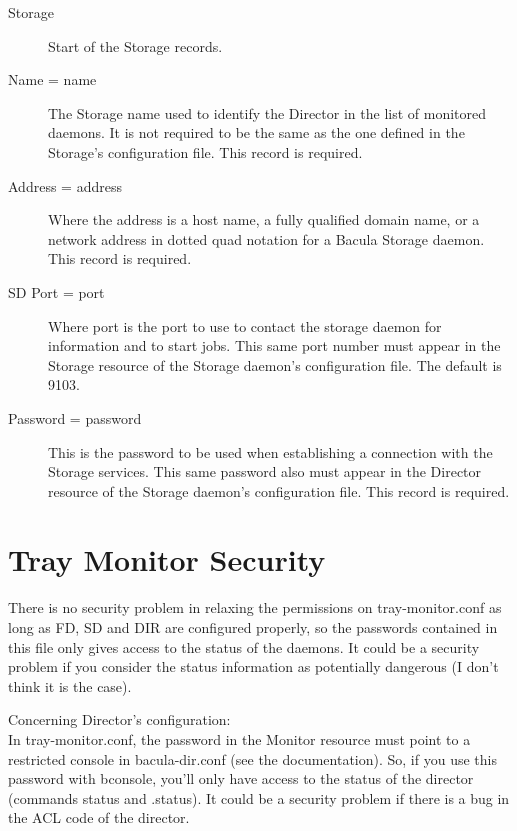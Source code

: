 \begin{description}

\item [Storage]
   Start of the Storage records. 

\item [Name = \lt{}name\gt{}]
   The Storage name used to identify  the Director in the list of monitored
daemons. It is not required  to be the same as the one defined in the Storage's
configuration file.  This record is required. 

\item [Address = \lt{}address\gt{}]
   Where the address is a host  name, a fully qualified domain name, or a network
address in  dotted quad notation for a Bacula Storage daemon.  This record is
required. 

\item [SD Port = \lt{}port\gt{}]
   Where port is the port to use to  contact the storage daemon for information
and to start jobs.  This same port number must appear in the Storage resource
of the  Storage daemon's configuration file. The default is 9103. 

\item [Password = \lt{}password\gt{}]
   This is the password to be used  when establishing a connection with the
Storage services. This  same password also must appear in the Director
resource of the Storage  daemon's configuration file. This record is required.

\end{description}

\section{Tray Monitor Security}

There is no security problem in relaxing the permissions on
tray-monitor.conf as long as FD, SD and DIR are configured properly, so
the passwords contained in this file only gives access to the status of
the daemons. It could be a security problem if you consider the status
information as potentially dangerous (I don't think it is the case).

Concerning Director's configuration: \\
In tray-monitor.conf, the password in the Monitor resource must point to
a restricted console in bacula-dir.conf (see the documentation). So, if
you use this password with bconsole, you'll only have access to the
status of the director (commands status and .status).
It could be a security problem if there is a bug in the ACL code of the
director.

